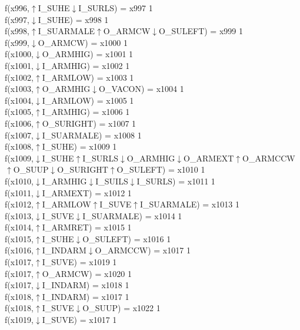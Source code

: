 f(x996,$\uparrow$I\_SUHE$\downarrow$I\_SURLS) = x997 {1} \\
f(x997,$\downarrow$I\_SUHE) = x998 {1} \\
f(x998,$\uparrow$I\_SUARMALE$\uparrow$O\_ARMCW$\downarrow$O\_SULEFT) = x999 {1} \\
f(x999,$\downarrow$O\_ARMCW) = x1000 {1} \\
f(x1000,$\downarrow$O\_ARMHIG) = x1001 {1} \\
f(x1001,$\downarrow$I\_ARMHIG) = x1002 {1} \\
f(x1002,$\uparrow$I\_ARMLOW) = x1003 {1} \\
f(x1003,$\uparrow$O\_ARMHIG$\downarrow$O\_VACON) = x1004 {1} \\
f(x1004,$\downarrow$I\_ARMLOW) = x1005 {1} \\
f(x1005,$\uparrow$I\_ARMHIG) = x1006 {1} \\
f(x1006,$\uparrow$O\_SURIGHT) = x1007 {1} \\
f(x1007,$\downarrow$I\_SUARMALE) = x1008 {1} \\
f(x1008,$\uparrow$I\_SUHE) = x1009 {1} \\
f(x1009,$\downarrow$I\_SUHE$\uparrow$I\_SURLS$\downarrow$O\_ARMHIG$\downarrow$O\_ARMEXT$\uparrow$O\_ARMCCW$\uparrow$O\_SUUP$\downarrow$O\_SURIGHT$\uparrow$O\_SULEFT) = x1010 {1} \\
f(x1010,$\downarrow$I\_ARMHIG$\downarrow$I\_SUILS$\downarrow$I\_SURLS) = x1011 {1} \\
f(x1011,$\downarrow$I\_ARMEXT) = x1012 {1} \\
f(x1012,$\uparrow$I\_ARMLOW$\uparrow$I\_SUVE$\uparrow$I\_SUARMALE) = x1013 {1} \\
f(x1013,$\downarrow$I\_SUVE$\downarrow$I\_SUARMALE) = x1014 {1} \\
f(x1014,$\uparrow$I\_ARMRET) = x1015 {1} \\
f(x1015,$\uparrow$I\_SUHE$\downarrow$O\_SULEFT) = x1016 {1} \\
f(x1016,$\uparrow$I\_INDARM$\downarrow$O\_ARMCCW) = x1017 {1} \\
f(x1017,$\uparrow$I\_SUVE) = x1019 {1} \\
f(x1017,$\uparrow$O\_ARMCW) = x1020 {1} \\
f(x1017,$\downarrow$I\_INDARM) = x1018 {1} \\
f(x1018,$\uparrow$I\_INDARM) = x1017 {1} \\
f(x1018,$\uparrow$I\_SUVE$\downarrow$O\_SUUP) = x1022 {1} \\
f(x1019,$\downarrow$I\_SUVE) = x1017 {1} \\
